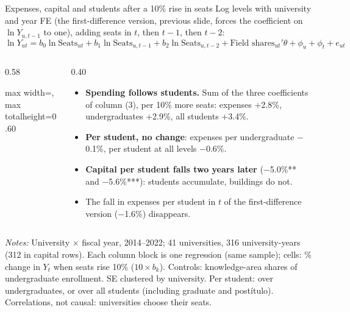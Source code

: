 \documentclass{beamer}
\begin{document}
\begin{frame}[label=d5-tm1-finance-levels]{Expenses, capital and students after a 10\% rise in seats}
\scriptsize
Log levels with university and year FE (the first-difference version, previous slide, forces the coefficient on $\ln Y_{u,t-1}$ to one), adding seats in $t$, then $t-1$, then $t-2$:
\vspace{-0.25cm}
\[
\ln Y_{ut} = b_0 \ln \text{Seats}_{ut} + b_1 \ln \text{Seats}_{u,t-1} + b_2 \ln \text{Seats}_{u,t-2} + \text{Field shares}_{ut}'\theta + \phi_u + \phi_t + e_{ut}
\]
\vspace{-0.45cm}
\begin{columns}[T,onlytextwidth]
\begin{column}{0.58\textwidth}
\centering
\tiny
\begin{adjustbox}{max width=\linewidth, max totalheight=0.60\textheight}

\end{adjustbox}
\end{column}
\begin{column}{0.40\textwidth}
\scriptsize
\begin{itemize}
    \setlength{\itemsep}{2pt}
    \item \textbf{Spending follows students.} Sum of the three coefficients of column (3), per 10\% more seats: expenses +2.8\%, undergraduates +2.9\%, all students +3.4\%.
    \item \textbf{Per student, no change}: expenses per undergraduate $-$0.1\%, per student at all levels $-$0.6\%.
    \item \textbf{Capital per student falls two years later} ($-$5.0\%** and $-$5.6\%***): students accumulate, buildings do not.
    \item The fall in expenses per student in $t$ of the first-difference version ($-$1.6\%) disappears.
\end{itemize}
\end{column}
\end{columns}

\vspace{0.03cm}
\parbox{0.97\textwidth}{\tiny \textit{Notes:} University $\times$ fiscal year, 2014--2022; 41 universities, 316 university-years (312 in capital rows). Each column block is one regression (same sample); cells: \% change in $Y_t$ when seats rise 10\% ($10\times b_k$). Controls: knowledge-area shares of undergraduate enrollment. SE clustered by university. Per student: over undergraduates, or over all students (including graduate and post\'itulo). Correlations, not causal: universities choose their seats.}
\end{frame}
\end{document}
